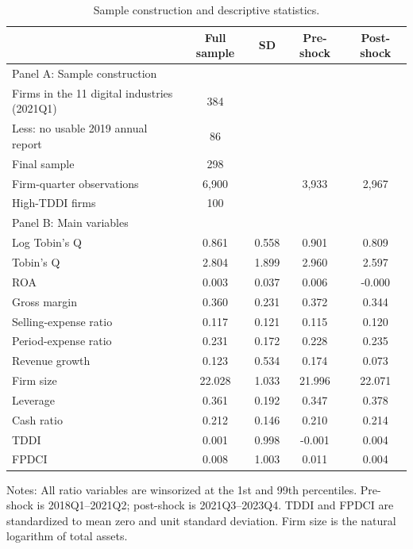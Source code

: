 \begin{table}[htbp]
\centering
\small
\caption{Sample construction and descriptive statistics.}
\label{tab:desc}
\begin{threeparttable}
\begin{tabular}{lcccc}
\toprule
 & Full sample & SD & Pre-shock & Post-shock \\
\midrule
\multicolumn{5}{l}{Panel A: Sample construction} \\
Firms in the 11 digital industries (2021Q1) & 384 & & & \\
\quad Less: no usable 2019 annual report & 86 & & & \\
\quad Final sample & 298 & & & \\
Firm-quarter observations & 6{,}900 & & 3,933 & 2,967 \\
High-TDDI firms & 100 & & & \\
\midrule
\multicolumn{5}{l}{Panel B: Main variables} \\
Log Tobin's Q & 0.861 & 0.558 & 0.901 & 0.809 \\
Tobin's Q & 2.804 & 1.899 & 2.960 & 2.597 \\
ROA & 0.003 & 0.037 & 0.006 & -0.000 \\
Gross margin & 0.360 & 0.231 & 0.372 & 0.344 \\
Selling-expense ratio & 0.117 & 0.121 & 0.115 & 0.120 \\
Period-expense ratio & 0.231 & 0.172 & 0.228 & 0.235 \\
Revenue growth & 0.123 & 0.534 & 0.174 & 0.073 \\
Firm size & 22.028 & 1.033 & 21.996 & 22.071 \\
Leverage & 0.361 & 0.192 & 0.347 & 0.378 \\
Cash ratio & 0.212 & 0.146 & 0.210 & 0.214 \\
TDDI & 0.001 & 0.998 & -0.001 & 0.004 \\
FPDCI & 0.008 & 1.003 & 0.011 & 0.004 \\
\bottomrule
\end{tabular}
\begin{tablenotes}[flushleft]
\footnotesize
\item Notes: All ratio variables are winsorized at the 1st and 99th percentiles. Pre-shock is 2018Q1--2021Q2; post-shock is 2021Q3--2023Q4. TDDI and FPDCI are standardized to mean zero and unit standard deviation. Firm size is the natural logarithm of total assets.
\end{tablenotes}
\end{threeparttable}
\end{table}
